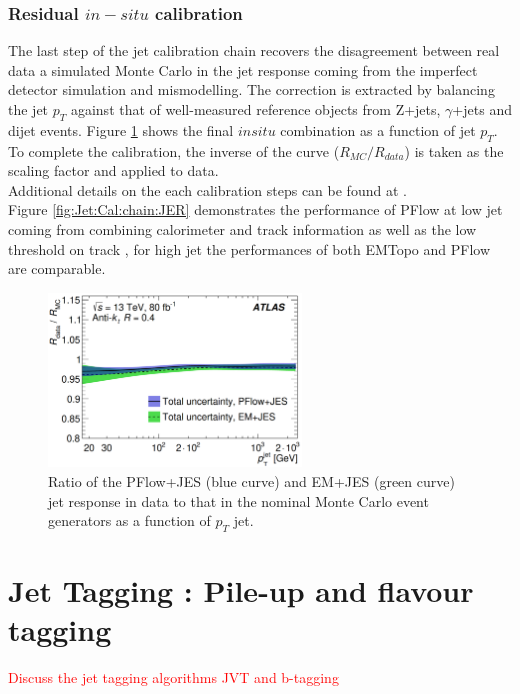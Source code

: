 \subsubsection{Residual $in-situ$ calibration}
\label{Jet:Cal:chain:InSitu}
The last step of the jet calibration chain recovers the disagreement between real data a simulated Monte Carlo in the jet response coming from the imperfect detector simulation and mismodelling. The correction is extracted by balancing the jet $p_T$ against that of well-measured reference objects from Z+jets, $\gamma$+jets and dijet events. Figure \ref{fig:Jet:Cal:chain:InSitu} shows the final $in situ$ combination as a function of jet $p_T$. To complete the calibration, the inverse of the curve ($R_{MC}/R_{data}$) is taken as the scaling factor and applied to data. \\
Additional details on the each calibration steps can be found at \cite{JES_Sys_13_TeV}. \\
Figure \ref{fig:Jet:Cal:chain:JER} demonstrates the performance of PFlow at low jet \pT coming from combining calorimeter and track information as well as the low threshold on track \pT, for high jet \pT the performances of both EMTopo and PFlow are comparable. 
\begin{figure}[ht]
    \centering
    \includegraphics[width=0.6\textwidth]{Ch4/Img/Jet_MC_Data_Ration.png}
    \caption{Ratio of the PFlow+JES (blue curve) and EM+JES (green curve) jet response in data to that in the nominal Monte Carlo event generators as a function of $p_T$ jet.}
    \label{fig:Jet:Cal:chain:InSitu}
\end{figure}
\section{Jet Tagging : Pile-up and flavour tagging}
\label{Jet:Tag}
\textcolor{red}{Discuss the jet tagging algorithms JVT and b-tagging \\} 

